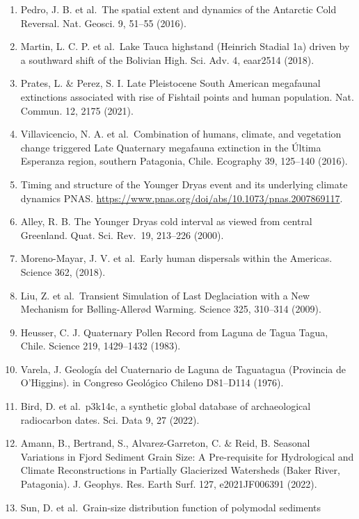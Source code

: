 \documentclass[
]{article}
\begin{document}
\begin{enumerate}
  Salado basin (22°S) of Northern Chile. Quat. Res. 65, 450--466 (2006).
\item
  Pedro, J. B. et al.~The spatial extent and dynamics of the Antarctic
  Cold Reversal. Nat. Geosci. 9, 51--55 (2016).
\item
  Martin, L. C. P. et al.~Lake Tauca highstand (Heinrich Stadial 1a)
  driven by a southward shift of the Bolivian High. Sci. Adv. 4,
  eaar2514 (2018).
\item
  Prates, L. \& Perez, S. I. Late Pleistocene South American megafaunal
  extinctions associated with rise of Fishtail points and human
  population. Nat. Commun. 12, 2175 (2021).
\item
  Villavicencio, N. A. et al.~Combination of humans, climate, and
  vegetation change triggered Late Quaternary megafauna extinction in
  the Última Esperanza region, southern Patagonia, Chile. Ecography 39,
  125--140 (2016).
\item
  Timing and structure of the Younger Dryas event and its underlying
  climate dynamics \textbar{} PNAS.
  \url{https://www.pnas.org/doi/abs/10.1073/pnas.2007869117}.
\item
  Alley, R. B. The Younger Dryas cold interval as viewed from central
  Greenland. Quat. Sci. Rev.~19, 213--226 (2000).
\item
  Moreno-Mayar, J. V. et al.~Early human dispersals within the Americas.
  Science 362, (2018).
\item
  Liu, Z. et al.~Transient Simulation of Last Deglaciation with a New
  Mechanism for Bølling-Allerød Warming. Science 325, 310--314 (2009).
\item
  Heusser, C. J. Quaternary Pollen Record from Laguna de Tagua Tagua,
  Chile. Science 219, 1429--1432 (1983).
\item
  Varela, J. Geología del Cuaternario de Laguna de Taguatagua (Provincia
  de O'Higgins). in Congreso Geológico Chileno D81--D114 (1976).
\item
  Bird, D. et al.~p3k14c, a synthetic global database of archaeological
  radiocarbon dates. Sci. Data 9, 27 (2022).
\item
  Amann, B., Bertrand, S., Alvarez-Garreton, C. \& Reid, B. Seasonal
  Variations in Fjord Sediment Grain Size: A Pre-requisite for
  Hydrological and Climate Reconstructions in Partially Glacierized
  Watersheds (Baker River, Patagonia). J. Geophys. Res. Earth Surf. 127,
  e2021JF006391 (2022).
\item
  Sun, D. et al.~Grain-size distribution function of polymodal sediments

\end{enumerate}
\end{document}
